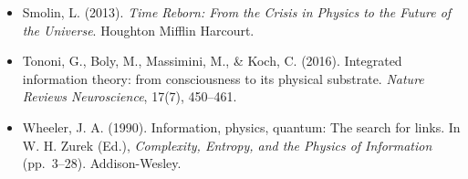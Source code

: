 \documentclass[11pt,a4paper]{article}
\begin{document}
\begin{itemize}[leftmargin=1.8em, itemindent=-1.8em, label={}, itemsep=0.45em]
    \item Smolin, L. (2013). \emph{Time Reborn: From the Crisis in Physics to the Future of the Universe}. Houghton Mifflin Harcourt.

    \item Tononi, G., Boly, M., Massimini, M., \& Koch, C. (2016). Integrated information theory: from consciousness to its physical substrate. \emph{Nature Reviews Neuroscience}, 17(7), 450--461.

    \item Wheeler, J. A. (1990). Information, physics, quantum: The search for links. In W. H. Zurek (Ed.), \emph{Complexity, Entropy, and the Physics of Information} (pp.\ 3--28). Addison-Wesley.
\end{itemize}
\end{document}
